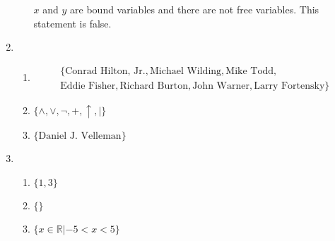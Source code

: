 \documentclass{article}
\begin{document}
\begin{enumerate}
\begin{enumerate}
    $x$ and $y$ are bound variables and there are not free variables.  This statement is false.
  \end{enumerate}
\item
  \begin{enumerate}
  \item
    \begin{equation*}
      \begin{aligned}
	\{ \text{Conrad Hilton, Jr.}, \text{Michael Wilding}, \text{Mike Todd}, \\
	\text{Eddie Fisher}, \text{Richard Burton}, \text{John Warner}, \text{Larry Fortensky}
      \}
      \end{aligned}
    \end{equation*}
  \item
    $\{\land, \lor, \lnot, +, \uparrow, | \}$
  \item
    $\{\text{Daniel J. Velleman}\}$
  \end{enumerate}
\item
  \begin{enumerate}
  \item $\{1, 3\}$
  \item $\{\}$
  \item $\{x \in \mathbb{R} | -5 < x < 5\}$
  \end{enumerate}
\end{enumerate}
\end{document}

